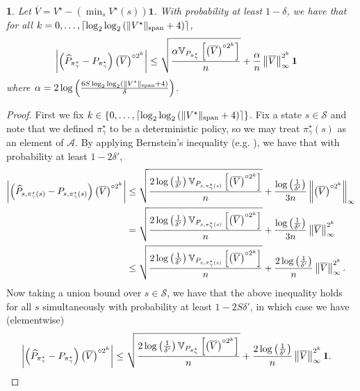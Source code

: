 \documentclass{article}
\theoremstyle{plain}
\theoremstyle{plain}
\newtheorem{lem}[thm]{\protect\lemmaname}
\theoremstyle{remark}
\theoremstyle{plain}
\theoremstyle{plain}
\providecommand{\lemmaname}{Lemma}
\newcommand{\Var}{\mathbb{V}}
\newcommand{\Phat}{\widehat{P}}
\newcommand{\pistar}{\pi^\star}
\newcommand{\one}{\mathbf{1}}
\newcommand{\Vc}{\overline{V}}
\newcommand{\A}{\mathcal{A}}
\renewcommand{\S}{\mathcal{S}}
\begin{document}
\begin{lem}
\label{lem:simple_DMDP_bernstein_bound}
    Let $\Vc = V^{\star} - \left(\min_s V^{\star}(s)\right)\one$. With probability at least $1 - \delta$, we have that for all $k = 0, \dots, \left\lceil\log_2 \log_2 \left( \Vert V^\star\Vert _{\textnormal{span}} + 4\right) \right\rceil$,
    \begin{align*}
        \left| \left(\Phat_{\pistar_\gamma} - P_{\pistar_\gamma}\right) \left( \Vc \right)^{\circ 2^k} \right|
    &\leq \sqrt{\frac{\alpha   \Var_{P_{\pistar_\gamma}} \left[ \left(\Vc \right)^{\circ 2^k}  \right]    }{n }} + \frac{\alpha  }{n}  \infnorm{\Vc}^{2^k}   \one
    \end{align*}
    where $\alpha = 2 \log \left( \frac{6 S \log_2 \log_2 \left(\Vert V^\star\Vert _{\textnormal{span}}+4 \right)}{\delta} \right)$.
\end{lem}
\begin{proof}
    First we fix $k \in \{0, \dots, \left\lceil\log_2 \log_2 \left( \Vert V^\star\Vert _{\textnormal{span}} + 4\right) \right\rceil\}$. Fix a state $s \in \S$ and note that we defined $\pistar_\gamma$ to be a deterministic policy, so we may treat $\pistar_\gamma(s) $ as an element of $\A$. By applying Bernstein's inequality (e.g. \citealt[Theorem 3]{maurer_empirical_2009}), we have that with probability at least $1 - 2 \delta'$,
    \begin{align*}
        \left| \left(\Phat_{s,\pistar_\gamma(s)} - P_{s,\pistar_\gamma(s)}\right) \left( \Vc \right)^{\circ 2^k} \right|
    &\leq \sqrt{\frac{ 2\log \left(\frac{1}{\delta'} \right)   \Var_{P_{s,\pistar_\gamma(s)}} \left[ \left(\Vc \right)^{\circ 2^k}  \right]    }{n }} + \frac{  \log \left(\frac{1}{\delta'} \right)  }{3n}  \infnorm{\left(\Vc \right)^{\circ 2^k}}  \\
    &= \sqrt{\frac{ 2\log \left(\frac{1}{\delta'} \right)   \Var_{P_{s,\pistar_\gamma(s)}} \left[ \left(\Vc \right)^{\circ 2^k}  \right]    }{n }} + \frac{  \log \left(\frac{1}{\delta'} \right)  }{3n}  \infnorm{\Vc}^{2^k} \\
    & \leq \sqrt{\frac{ 2\log \left(\frac{1}{\delta'} \right)   \Var_{P_{s,\pistar_\gamma(s)}} \left[ \left(\Vc \right)^{\circ 2^k}  \right]    }{n }} + \frac{ 2 \log \left(\frac{1}{\delta'} \right)  }{n}  \infnorm{\Vc}^{2^k}.
    \end{align*}
    Now taking a union bound over $s \in \S$, we have that the above inequality holds for all $s$ simultaneously with probability at least $1 - 2S \delta'$, in which case we have (elementwise)
    \begin{align*}
        \left| \left(\Phat_{\pistar_\gamma} - P_{\pistar_\gamma}\right) \left( \Vc \right)^{\circ 2^k} \right| & \leq \sqrt{\frac{ 2\log \left(\frac{1}{\delta'} \right)   \Var_{P_{\pistar_\gamma}} \left[ \left(\Vc \right)^{\circ 2^k}  \right]    }{n }} + \frac{ 2 \log \left(\frac{1}{\delta'} \right)  }{n}  \infnorm{\Vc}^{2^k} \one.

\end{align*}
\end{proof}
\end{document}
